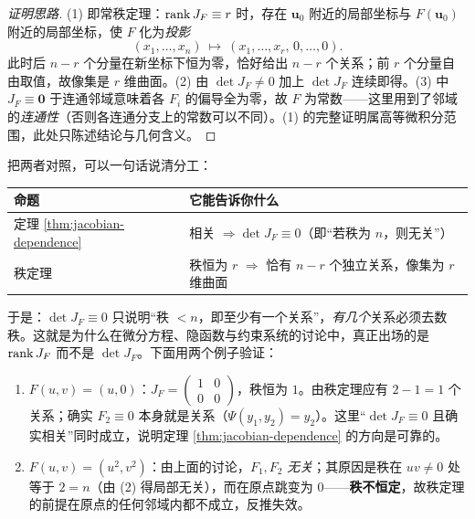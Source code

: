 \begin{proof}[证明思路]
(1) 即常秩定理：\(\operatorname{rank} J_F\equiv r\) 时，存在 \(\mathbf u_0\) 附近的局部坐标与 \(F(\mathbf u_0)\) 附近的局部坐标，使 \(F\) 化为\emph{投影}
\[
(x_1,\dots,x_n)\ \longmapsto\ (x_1,\dots,x_r,\,0,\dots,0).
\]
此时后 \(n-r\) 个分量在新坐标下恒为零，恰好给出 \(n-r\) 个关系；前 \(r\) 个分量自由取值，故像集是 \(r\) 维曲面。(2) 由 \(\det J_F\ne0\) 加上 \(\det J_F\) 连续即得。(3) 中 \(J_F\equiv\mathbf 0\) 于连通邻域意味着各 \(F_i\) 的偏导全为零，故 \(F\) 为常数——这里用到了邻域的\emph{连通性}（否则各连通分支上的常数可以不同）。(1) 的完整证明属高等微积分范围，此处只陈述结论与几何含义。
\end{proof}

\begin{remark}
把两者对照，可以一句话说清分工：
\begin{center}
\renewcommand{\arraystretch}{1.3}
\begin{tabular}{ll}
\hline
命题 & 它能告诉你什么\\
\hline
定理 \ref{thm:jacobian-dependence} & 相关 \(\Rightarrow\det J_F\equiv0\)（即“若秩为 \(n\)，则无关”）\\
秩定理 & 秩恒为 \(r\) \(\Rightarrow\) 恰有 \(n-r\) 个独立关系，像集为 \(r\) 维曲面\\
\hline
\end{tabular}
\end{center}
于是：\(\det J_F\equiv0\) 只说明“秩 \(<n\)，即至少有一个关系”，\emph{有几个}关系必须去数秩。这就是为什么在微分方程、隐函数与约束系统的讨论中，真正出场的是 \(\operatorname{rank} J_F\) 而不是 \(\det J_F\)。下面用两个例子验证：
\begin{enumerate}[label=(\arabic*)]
  \item \(F(u,v)=(u,0)\)：\(J_F=\begin{pmatrix}1&0\\0&0\end{pmatrix}\)，秩恒为 \(1\)。由秩定理应有 \(2-1=1\) 个关系；确实 \(F_2\equiv0\) 本身就是关系（\(\Psi(y_1,y_2)=y_2\)）。这里“\(\det J_F\equiv0\) 且确实相关”同时成立，说明定理 \ref{thm:jacobian-dependence} 的方向是可靠的。
  \item \(F(u,v)=(u^2,v^2)\)：由上面的讨论，\(F_1,F_2\) \emph{无关}；其原因是秩在 \(uv\ne0\) 处等于 \(2=n\)（由 (2) 得局部无关），而在原点跳变为 \(0\)——\textbf{秩不恒定}，故秩定理的前提在原点的任何邻域内都不成立，反推失效。
\end{enumerate}
\end{remark}

